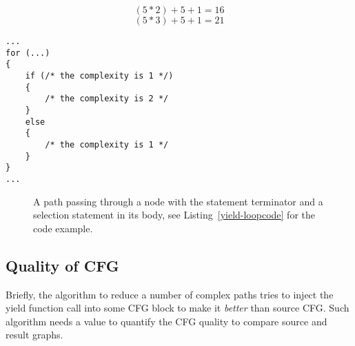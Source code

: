 \begin{equation}
\label{equation-1}
(5 * 2) + 5 + 1 = 16
\end{equation}
\begin{equation}
\label{equation-2}
(5 * 3) + 5 + 1 = 21
\end{equation}

\begin{lstlisting}[caption={A loop statement and a selection statment in a loop body.}, label={yield-loopcode}]
...
for (...)
{
    if (/* the complexity is 1 */)
    {
        /* the complexity is 2 */
    }
    else
    {
        /* the complexity is 1 */
    }
}
...
\end{lstlisting}

\begin{figure}[h!]
\centering
\vspace{0.5cm}
\caption{A path passing through a node with the  statement terminator and a selection statement in its body, see Listing~\ref{yield-loopcode} for the code example.}
\label{yield-loop}
\end{figure}

\subsection{Quality of CFG}
\label{yield-quality}
Briefly, the algorithm to reduce a number of complex paths tries to inject the yield function call into some CFG block to make it \textit{better} than source CFG. Such algorithm needs a value to quantify the CFG quality to compare source and result graphs.

